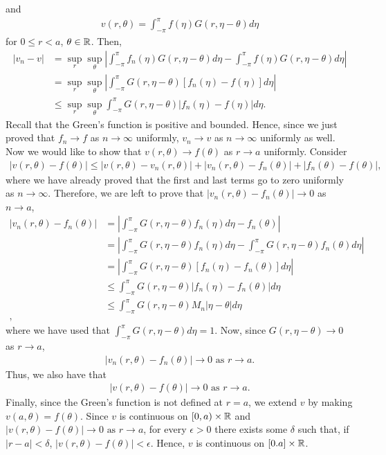 \begin{questions}
\begin{solution}
and
\begin{align*}
v(r,\theta)=\int_{-\pi}^{\pi}f(\eta)G(r,\eta-\theta)d\eta
\end{align*}
for $0\leq r <a$, $\theta\in\mathbb{R}$. Then,
\begin{align*}
|v_n-v|&=\sup_r\sup_{\theta}\left|\int_{-\pi}^{\pi}f_n(\eta)G(r,\eta-\theta)d\eta-\int_{-\pi}^{\pi}f(\eta)G(r,\eta-\theta)d\eta\right|\\
&=\sup_r\sup_{\theta}\left|\int_{-\pi}^{\pi}G(r,\eta-\theta)\left[f_n(\eta)-f(\eta)\right]d\eta\right|\\
&\leq\sup_r\sup_{\theta}\int_{-\pi}^{\pi}G(r,\eta-\theta)\left|f_n(\eta)-f(\eta)\right|d\eta.
\end{align*}
Recall that the Green's function is positive and bounded. Hence, since we just proved that $f_n\rightarrow f$ as $n\rightarrow\infty$ uniformly, $v_n\rightarrow v$ as $n\rightarrow\infty$ uniformly as well.
Now we would like to show that $v(r,\theta)\rightarrow f(\theta)$ as $r\to a$ uniformly. Consider
\begin{align*}
|v(r,\theta)-f(\theta)|\leq|v(r,\theta)-v_n(r,\theta)|+|v_n(r,\theta)-f_n(\theta)|+|f_n(\theta)-f(\theta)|,
\end{align*}
where we have already proved that the first and last terms go to zero uniformly as $n\to\infty$. Therefore, we are left to prove that $|v_n(r,\theta)-f_n(\theta)|\to 0$ as $n\to a$,
\begin{align*}
|v_n(r,\theta)-f_n(\theta)|&=\left|\int_{-\pi}^{\pi}G(r,\eta-\theta)f_n(\eta)d\eta-f_n(\theta)\right|\\
&=\left|\int_{-\pi}^{\pi}G(r,\eta-\theta)f_n(\eta)d\eta-\int_{-\pi}^{\pi}G(r,\eta-\theta)f_n(\theta)d\eta\right|\\
&=\left|\int_{-\pi}^{\pi}G(r,\eta-\theta)\left[f_n(\eta)-f_n(\theta)\right]d\eta\right|\\
&\leq\int_{-\pi}^{\pi}G(r,\eta-\theta)\left|f_n(\eta)-f_n(\theta)\right|d\eta\\
&\leq\int_{-\pi}^{\pi}G(r,\eta-\theta)M_n\left|\eta-\theta\right|d\eta\\,
\end{align*}
where we have used that $\int_{-\pi}^{\pi}G(r,\eta-\theta)d\eta=1$. Now, since $G(r,\eta-\theta)\to 0$ as $r\to a$,
\begin{align*}
|v_n(r,\theta)-f_n(\theta)|\to 0\text{ as }r\to a.
\end{align*}
Thus, we also have that
\begin{align*}
|v(r,\theta)-f(\theta)|\to 0\text{ as }r\to a.
\end{align*}
Finally, since the Green's function is not defined at $r=a$, we extend $v$ by making $v(a,\theta)=f(\theta)$. Since $v$ is continuous on $[0,a)\times\mathbb{R}$ and $|v(r,\theta)-f(\theta)|\to 0\text{ as }r\to a$, for every $\epsilon>0$ there exists some $\delta$ such that, if $|r-a|<\delta$, $|v(r,\theta)-f(\theta)|<\epsilon$. Hence, $v$ is continuous on $[0.a]\times\mathbb{R}$.
\end{solution}
\end{questions}